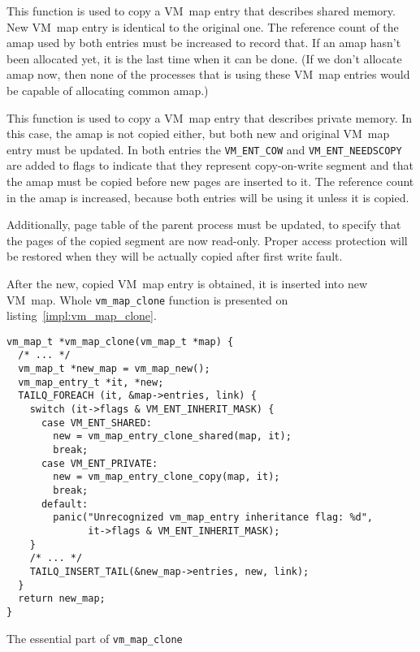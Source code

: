 \begin{description}[style=nextline]
  \item[\texttt{vm_map_entry_clone_shared(vm_map_t *map, vm_map_entry_t *ent);}]
    This function is used to copy a VM~map entry that describes shared memory.
    New VM~map entry is identical to the original one.
    The reference count of the amap used by both entries must be increased to record that.
    If an amap hasn't been allocated yet, it is the last time when it can be done.
    (If we don't allocate amap now, then none of the processes that is using these VM~map entries would be capable of allocating common amap.)

  \item[\texttt{vm_map_entry_clone_copy(vm_map_t *map, vm_map_entry_t *ent);}]
    This function is used to copy a VM~map entry that describes private memory.
    In this case, the amap is not copied either, but both new and original VM~map entry must be updated.
    In both entries the \texttt{VM_ENT_COW} and \texttt{VM_ENT_NEEDSCOPY} are added to flags to indicate that they represent copy-on-write segment
    and that the amap must be copied before new pages are inserted to it.
    The reference count in the amap is increased, because both entries will be using it unless it is copied.

    Additionally, page table of the parent process must be updated, to specify that the pages of the copied segment are now read-only.
    Proper access protection will be restored when they will be actually copied after first write fault.
\end{description}

After the new, copied VM~map entry is obtained, it is inserted into new VM~map.
Whole \texttt{vm_map_clone} function is presented on listing~\ref{impl:vm_map_clone}.

\begin{listing}[h]
  \begin{verbatim}
vm_map_t *vm_map_clone(vm_map_t *map) {
  /* ... */
  vm_map_t *new_map = vm_map_new();
  vm_map_entry_t *it, *new;
  TAILQ_FOREACH (it, &map->entries, link) {
    switch (it->flags & VM_ENT_INHERIT_MASK) {
      case VM_ENT_SHARED:
        new = vm_map_entry_clone_shared(map, it);
        break;
      case VM_ENT_PRIVATE:
        new = vm_map_entry_clone_copy(map, it);
        break;
      default:
        panic("Unrecognized vm_map_entry inheritance flag: %d",
              it->flags & VM_ENT_INHERIT_MASK);
    }
    /* ... */
    TAILQ_INSERT_TAIL(&new_map->entries, new, link);
  }
  return new_map;
}
  \end{verbatim}
  \caption{The essential part of \texttt{vm_map_clone}}
  \label{impl:vm_map_clone}
\end{listing}


